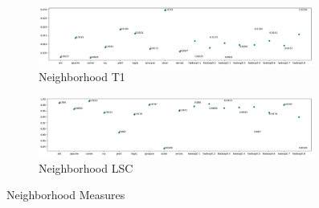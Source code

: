 \begin{figure}[h!]\ContinuedFloat
    \centering
    \begin{subfigure}{0.496\textwidth}
        \includegraphics[width=0.99\textwidth]{figures/neighborhood-T1.png}
        \caption{Neighborhood T1}
        \label{fig:neighborhood-t1}
    \end{subfigure}
    \begin{subfigure}{0.496\textwidth}
        \includegraphics[width=0.99\textwidth]{figures/neighborhood-LSC.png}
        \caption{Neighborhood LSC}
        \label{fig:neighborhood-lsc}
    \end{subfigure}
    \caption{Neighborhood Measures}
    \label{fig:neighborhood}
\end{figure}

